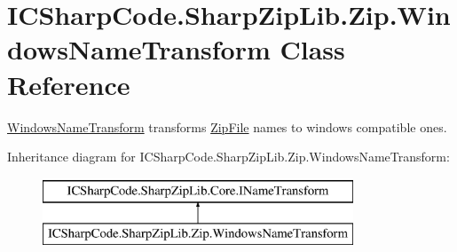 \hypertarget{class_i_c_sharp_code_1_1_sharp_zip_lib_1_1_zip_1_1_windows_name_transform}{}\section{I\+C\+Sharp\+Code.\+Sharp\+Zip\+Lib.\+Zip.\+Windows\+Name\+Transform Class Reference}
\label{class_i_c_sharp_code_1_1_sharp_zip_lib_1_1_zip_1_1_windows_name_transform}


\hyperlink{class_i_c_sharp_code_1_1_sharp_zip_lib_1_1_zip_1_1_windows_name_transform}{Windows\+Name\+Transform} transforms \hyperlink{class_i_c_sharp_code_1_1_sharp_zip_lib_1_1_zip_1_1_zip_file}{Zip\+File} names to windows compatible ones.  


Inheritance diagram for I\+C\+Sharp\+Code.\+Sharp\+Zip\+Lib.\+Zip.\+Windows\+Name\+Transform\+:\begin{figure}[H]
\begin{center}
\leavevmode
\includegraphics[height=2.000000cm]{class_i_c_sharp_code_1_1_sharp_zip_lib_1_1_zip_1_1_windows_name_transform}
\end{center}
\end{figure}
